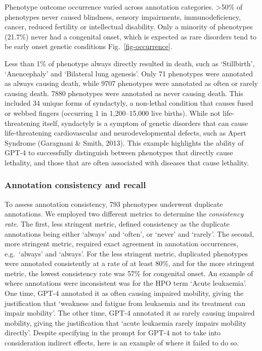 \documentclass[
]{agujournal2019}
\begin{document}
Phenotype outcome occurrence varied across annotation categories.
\textgreater50\% of phenotypes never caused blindness, sensory
impairments, immunodeficiency, cancer, reduced fertility or intellectual
disability. Only a minority of phenotypes (21.7\%) never had a
congenital onset, which is expected as rare disorders tend to be early
onset genetic conditions Fig.~\ref{fig-occurrence}.

Less than 1\% of phenotype always directly resulted in death, such as
`Stillbirth', `Anencephaly' and `Bilateral lung agenesis'. Only 71
phenotypes were annotated as always causing death, while 9707 phenotypes
were annotated as often or rarely causing death. 7880 phenotypes were
annotated as never causing death. This included 34 unique forms of
syndactyly, a non-lethal condition that causes fused or webbed fingers
(occurring 1 in 1,200--15,000 live births). While not life-threatening
itself, syndactyly is a symptom of genetic disorders that can cause
life-threatening cardiovascular and neurodevelopmental defects, such as
Apert Syndrome (Garagnani \& Smith, 2013). This example highlights the
ability of GPT-4 to successfully distinguish between phenotypes that
directly cause lethality, and those that are often associated with
diseases that cause lethality.

\subsubsection{Annotation consistency and
recall}\label{annotation-consistency-and-recall}

To assess annotation consistency, 793 phenotypes underwent duplicate
annotations. We employed two different metrics to determine the
\emph{consistency rate}. The first, less stringent metric, defined
consistency as the duplicate annotations being either `always' and
`often', or `never' and `rarely'. The second, more stringent metric,
required exact agreement in annotation occurrences, e.g.~`always' and
`always'. For the less stringent metric, duplicated phenotypes were
annotated consistently at a rate of at least 80\%, and for the more
stringent metric, the lowest consistency rate was 57\% for congenital
onset. An example of where annotations were inconsistent was for the HPO
term `Acute leukaemia'. One time, GPT-4 annotated it as often causing
impaired mobility, giving the justification that `weakness and fatigue
from leukaemia and its treatment can impair mobility'. The other time,
GPT-4 annotated it as rarely causing impaired mobility, giving the
justification that `acute leukaemia rarely impairs mobility directly'.
Despite specifying in the prompt for GPT-4 not to take into
consideration indirect effects, here is an example of where it failed to
do so.
\end{document}
